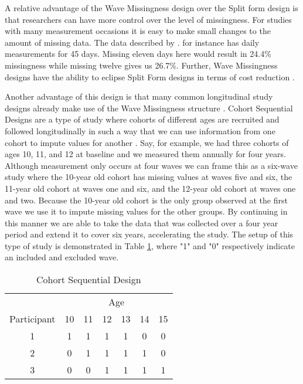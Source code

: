 \documentclass{svjour3}                     %
\begin{document}
A relative advantage of the Wave Missingness design over the Split form design is that researchers can have more control over the level of missingness. For studies with many measurement occasions it is easy to make small changes to the amount of missing data. The data described by \citet{pellowski2016alcohol}. \citet{pellowski2016alcohol} for instance has daily measurements for 45 days. Missing eleven days here would result in 24.4\% missingness while missing twelve gives us 26.7\%. Further, Wave Missingness designs have the ability to eclipse Split Form designs in terms of cost reduction \citep{little2013planned}. \par

Another advantage of this design is that many common longitudinal study designs already make use of the Wave Missingness structure \citep{little2013planned}. Cohort Sequential Designs are a type of study where cohorts of different ages are recruited and followed longitudinally in such a way that we can use information from one cohort to impute values for another \citep{little2013longitudinal, duncan2013introduction}. Say, for example, we had three cohorts of ages 10, 11, and 12 at baseline and we measured them annually for four years. Although measurement only occurs at four waves we can frame this as a six-wave study where the 10-year old cohort has missing values at waves five and six, the 11-year old cohort at waves one and six, and the 12-year old cohort at waves one and two. Because the 10-year old cohort is the only group observed at the first wave we use it to impute missing values for the other groups. By continuing in this manner we are able to take the data that was collected over a four year period and extend it to cover six years, accelerating the study. The setup of this type of study is demonstrated in Table \ref{tab:table12}, where "1" and "0" respectively indicate an included and excluded wave. \par

\begin{table}[t!]
	\centering
	\caption{Cohort Sequential Design}
	\label{tab:table12}
	\setlength{\tabcolsep}{0.5cm}
	\begin{tabular}{c|cccccc}
		\toprule
		& \multicolumn{6}{c}{Age} \\
		Participant & 10 & 11 & 12 & 13 & 14 & 15 \\
		\midrule
		1 & 1 & 1 & 1 & 1 & 0 & 0\\
		2 & 0 & 1 & 1 & 1 & 1 & 0\\
		3 & 0 & 0 & 1 & 1 & 1 & 1\\
		\bottomrule
	\end{tabular}
\end{table}
\end{document}
